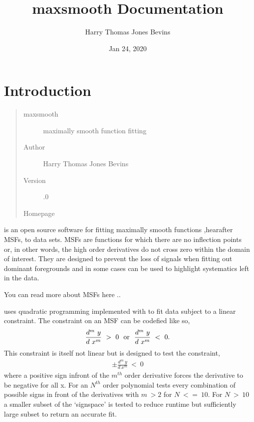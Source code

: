 \documentclass[letterpaper,10pt,english]{sphinxmanual}
\title{maxsmooth Documentation}
\date{Jan 24, 2020}
\author{Harry Thomas Jones Bevins}
\begin{document}
\pagestyle{empty}
\sphinxmaketitle
\pagestyle{plain}
\sphinxtableofcontents
\pagestyle{normal}
\label{\detokenize{source/index::doc}}



\chapter{Introduction}
\label{\detokenize{source/intro:introduction}}\begin{quote}\begin{description}
\item[{maxsmooth}] \leavevmode
maximally smooth function fitting

\item[{Author}] \leavevmode
Harry Thomas Jones Bevins

\item[{Version}] .0

\item[{Homepage}] \leavevmode
{}

\end{description}\end{quote}

 is an open source software for fitting maximally smooth functions
,hearafter MSFs, to data sets. MSFs are functions for which there are no
inflection points or, in other words, the high order derivatives do not cross
zero within the domain of interest. They are designed to prevent the loss of
signals when fitting out dominant foregrounds and in some cases can be used to
highlight systematics left in the data.

You can read more about MSFs here ..

 uses quadratic programming implemented with  to fit
data subject to a linear constraint. The constraint on an MSF can be codefied
like so,
\begin{equation*}
\begin{split}\frac{d^m~y}{d~x^m}~>~0~~\textnormal{or}~~\frac{d^m~y}{d~x^m}~<~0.\end{split}
\end{equation*}
This constraint is itself not linear but  is designed to test the
constraint,
\begin{equation*}
\begin{split}\pm \frac{d^m~y}{d~x^m}~<~0\end{split}
\end{equation*}
where a positive sign infront of the \(m^{th}\) order derivative forces the derivative
to be negative for all x. For an \(N^{th}\) order polynomial  tests
every combination of possible signs in front of the derivatives with \(m~>2\) for
\(N~<=~10\). For \(N~>~10\) a smaller subset of the ‘sign\sphinxhyphen{}space’ is
tested to reduce runtime but sufficiently large subset to return an accurate
fit.
\end{document}
